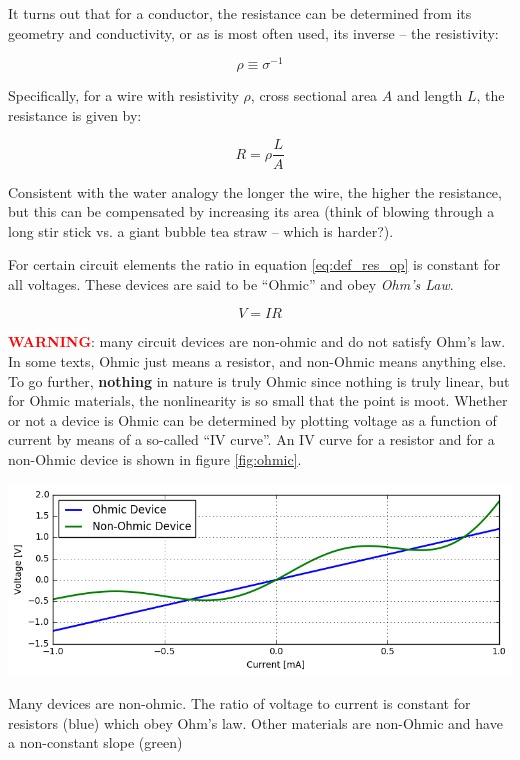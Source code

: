 \documentclass{tufte-book}
\begin{document}
It turns out that for a conductor, the resistance can be determined from its geometry and conductivity, or as is most often used, its inverse -- the resistivity:

\begin{equation}\label{eq:def_resistivity}
\rho \equiv \sigma^{-1}
\end{equation}

Specifically, for a wire with resistivity $\rho$, cross sectional area $A$ and length $L$, the resistance is given by:

\begin{equation}\label{eq:def_resistance}
R = \rho\frac{L}{A}
\end{equation}

Consistent with the water analogy the longer the wire, the higher the resistance, but this can be compensated by increasing its area (think of blowing through a long stir stick vs. a giant bubble tea straw -- which is harder?).

For certain circuit elements the ratio in equation \ref{eq:def_res_op} is constant for all voltages. These devices are said to be ``Ohmic'' and obey \textit{Ohm's Law}.

\begin{equation}\label{eq:ohmslaw}
  \boxed{V = IR}
\end{equation}

\noindent  \textcolor{red}{\textbf{WARNING}}: many circuit devices are non-ohmic and do not satisfy Ohm's law. In some texts, Ohmic just means a resistor, and non-Ohmic means anything else. To go further, \textbf{nothing} in nature is truly Ohmic since nothing is truly linear, but for Ohmic materials, the nonlinearity is so small that the point is moot. Whether or not a device is Ohmic can be determined by plotting voltage as a function of current by means of a so-called ``IV curve''. An IV curve for a resistor and for a non-Ohmic device is shown in figure \ref{fig:ohmic}.

\begin{marginfigure}%
  \includegraphics[width=\linewidth]{ohmicnonohmic}
\caption{Many devices are non-ohmic. The ratio of voltage to current is constant for resistors (blue) which obey Ohm's law. Other materials are non-Ohmic and have a non-constant slope (green) }
  \label{fig:ohmic}
\end{marginfigure}
\end{document}

